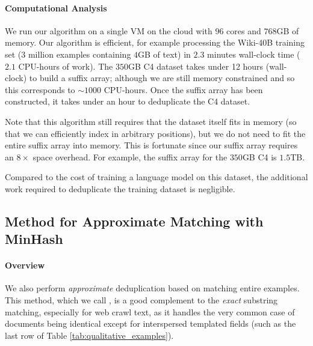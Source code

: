 \paragraph{Computational Analysis}
We run our algorithm on a single VM on the cloud with $96$ cores and $768$GB of memory.
Our algorithm is efficient, for example processing the Wiki-40B training set ($3$ million
examples containing $4$GB of text) in $2.3$ minutes wall-clock time ($2.1$ CPU-hours of work).
%
The $350$GB C4 dataset takes under 12 hours (wall-clock) to build a suffix array; although we are still memory constrained and so this corresponds to $\sim 1000$ CPU-hours. 
% 
Once the suffix array has been constructed, it takes under an hour to deduplicate the C4 dataset.


Note that this algorithm still requires that the dataset itself fits in memory
(so that we can efficiently index in arbitrary positions), but we do not need to fit the entire suffix array into memory.
This is fortunate since our suffix array requires an $8\times$ space overhead.
For example, the suffix array for the
$350$GB C4 is $1.5$TB.

%

Compared to the cost of training a language model on this dataset, the additional
work required to deduplicate the training dataset is negligible.








\subsection{Method for Approximate Matching with MinHash} \label{sec:approx}

\paragraph{Overview}

We also perform \emph{approximate} deduplication based on matching entire examples.
This method, which we call \Approx, is a good complement to the \emph{exact} substring matching, especially for web crawl text, as it handles the very common case of documents being identical except for interspersed templated fields (such as the last row of Table \ref{tab:qualitative_examples}).

